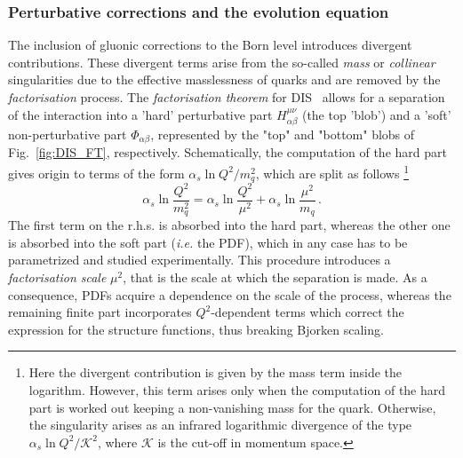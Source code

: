 \subsubsection*{Perturbative corrections and the evolution equation}
The inclusion of gluonic corrections to the Born level introduces divergent contributions. These divergent terms arise from the so-called \textit{mass} or \textit{collinear} singularities due to the effective masslessness of quarks and are removed by the \textit{factorisation} process. The \textit{factorisation theorem} for DIS~\cite{Collins:1989gx} allows for a separation of the interaction into a 'hard' perturbative part $H^{\mu \nu}_{\alpha \beta}$ (the top 'blob') and a 'soft' non-perturbative part $\Phi_{\alpha \beta}$, represented by the "top" and "bottom" blobs of Fig.~\ref{fig:DIS_FT}, respectively. Schematically, the computation of the hard part gives origin to terms of the form $\alpha_{s} \ln Q^2/m_q^2$, which are split as follows
\footnote{Here the divergent contribution is given by the mass term inside the logarithm. However, this term arises only when the computation of the hard part is worked out keeping a non-vanishing mass for the quark. Otherwise, the singularity arises as an infrared logarithmic divergence of the type $\alpha_{s} \ln Q^2/\mathcal{K}^2$, where $\mathcal{K}$ is the cut-off in momentum space.}
\begin{equation}
  \alpha_{s} \ln \frac{Q^2}{m_q^2} = \alpha_{s} \ln \frac{Q^2}{\mu^2} + \alpha_{s} \ln \frac{\mu^2}{m_{q}} \,.
\end{equation}
The first term on the r.h.s. is absorbed into the hard part, whereas the other one is absorbed into the soft part (\textit{i.e.} the PDF), which in any case has to be parametrized and studied experimentally. This procedure introduces a \textit{factorisation scale} $\mu^2$, that is the scale at which the separation is made. As a consequence, PDFs acquire a dependence on the scale of the process, whereas the remaining finite part incorporates $Q^2$-dependent terms which correct the expression for the structure functions, thus breaking Bjorken scaling.%

